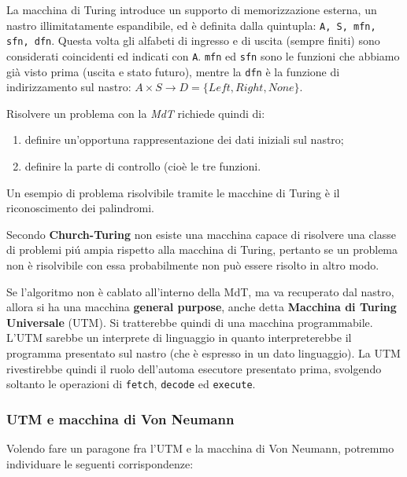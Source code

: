 \documentclass[11pt]{book}
\begin{document}
La macchina di Turing introduce un supporto di memorizzazione esterna,
un nastro illimitatamente espandibile, ed \`e definita dalla
quintupla: \texttt{A, S, mfn, sfn, dfn}. Questa volta gli alfabeti di
ingresso e di uscita (sempre finiti) sono considerati coincidenti ed
indicati con \texttt{A}. \texttt{mfn} ed \texttt{sfn} sono le funzioni
che abbiamo gi\`a visto prima (uscita e stato futuro), mentre la
\texttt{dfn} \`e la funzione di indirizzamento sul nastro: $A \times S
\rightarrow D = \{ Left, Right, None \}$.



Risolvere un problema con la \textit{MdT} richiede quindi di:

\begin{enumerate}
\item definire un'opportuna rappresentazione dei dati iniziali sul
  nastro;
\item definire la parte di controllo (cio\`e le tre funzioni.
\end{enumerate}

Un esempio di problema risolvibile tramite le macchine di Turing \`e
il riconoscimento dei palindromi.

Secondo \textbf{Church-Turing} non esiste una macchina capace di
risolvere una classe di problemi pi\'u ampia rispetto alla macchina di
Turing, pertanto se un problema non \`e risolvibile con essa
probabilmente non pu\`o essere risolto in altro modo.

Se l'algoritmo non \`e cablato all'interno della MdT, ma va recuperato
dal nastro, allora si ha una macchina \textbf{general purpose}, anche
detta \textbf{Macchina di Turing Universale} (UTM). Si tratterebbe
quindi di una macchina programmabile. L'UTM sarebbe un interprete di
linguaggio in quanto interpreterebbe il programma presentato sul
nastro (che \`e espresso in un dato linguaggio). La UTM rivestirebbe
quindi il ruolo dell'automa esecutore presentato prima, svolgendo
soltanto le operazioni di \texttt{fetch}, \texttt{decode} ed
\texttt{execute}.


\subsubsection*{UTM e macchina di Von Neumann}

Volendo fare un paragone fra l'UTM e la macchina di Von Neumann,
potremmo individuare le seguenti corrispondenze:
\end{document}
